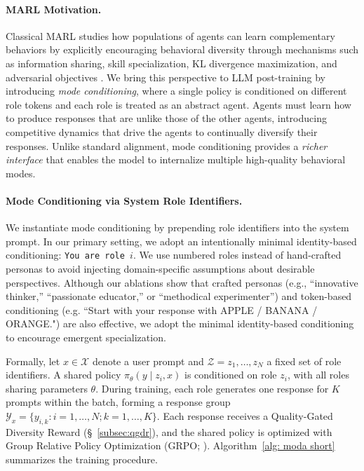 \paragraph{MARL Motivation.} Classical MARL studies how populations of agents can learn complementary behaviors by explicitly encouraging behavioral diversity through mechanisms such as information sharing, skill specialization, KL divergence maximization, and adversarial objectives \citep{eysenbach2018diversityneedlearningskills, liang2024learning, li2021celebratingdiversitysharedmultiagent}. We bring this perspective to LLM post-training by introducing \textit{mode conditioning}, where a single policy is conditioned on different role tokens and each role is treated as an abstract agent. Agents must learn how to produce responses that are unlike those of the other agents, introducing competitive dynamics that drive the agents to continually diversify their responses. Unlike standard alignment, mode conditioning provides a \textit{richer interface} that enables the model to internalize multiple high-quality behavioral modes.

\paragraph{Mode Conditioning via System Role Identifiers.} We instantiate mode conditioning by prepending role identifiers into the system prompt. In our primary setting, we adopt an intentionally minimal identity-based conditioning: \texttt{You are role $i$}. We use numbered roles instead of hand-crafted personas to avoid injecting domain-specific assumptions about desirable perspectives. Although our ablations show that crafted personas (e.g., ``innovative thinker,'' ``passionate educator,'' or ``methodical experimenter'') and token-based conditioning (e.g. ``Start with your response with APPLE / BANANA / ORANGE.") are also effective, we adopt the minimal identity-based conditioning to encourage emergent specialization.

Formally, let $x \in \mathcal{X}$ denote a user prompt and $\mathcal{Z}={z_1,\ldots,z_N}$ a fixed set of role identifiers. A shared policy $\pi_\theta(y\mid z_i, x)$ is conditioned on role $z_i$, with all roles sharing parameters $\theta$. During training, each role generates one response for $K$ prompts within the batch, forming a response group $\mathcal{Y}_x=\{y_{i,k}: i=1,\ldots,N; k=1,\ldots,K\}$. Each response receives a Quality-Gated Diversity Reward (\S~\ref{subsec:qgdr}), and the shared policy is optimized with Group Relative Policy Optimization (GRPO; \citep{shao2024deepseekmath}). Algorithm~\ref{alg: moda short} summarizes the training procedure.

